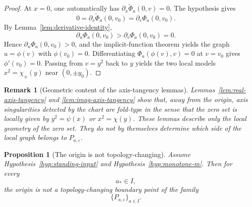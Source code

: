 \documentclass[11pt]{article}
\newtheorem{proposition}[theorem]{Proposition}
\newtheorem{remark}[theorem]{Remark}
\begin{document}
\begin{proof}
At \(x=0\), one automatically has \(\partial_x\widetilde\Phi_a(0,v)=0\). The hypothesis gives
\[
0=\partial_v\widetilde\Phi_a(0,v_0)=\partial_v\Phi_a(0,v_0).
\]
By Lemma~\ref{lem:derivative-identity},
\[
\partial_u\Phi_a(0,v_0)>\partial_v\Phi_a(0,v_0)=0.
\]
Hence \(\partial_u\Phi_a(0,v_0)>0\), and the implicit-function theorem yields the graph \(u=\phi(v)\) with \(\phi(v_0)=0\). Differentiating \(\Phi_a(\phi(v),v)=0\) at \(v=v_0\) gives \(\phi'(v_0)=0\). Passing from \(v=y^2\) back to \(y\) yields the two local models \(x^2=\chi_\pm(y)\) near \((0,\pm y_0)\).
\end{proof}

\begin{remark}[Geometric content of the axis-tangency lemmas]\label{rem:fold-geometry}
Lemmas~\ref{lem:real-axis-tangency} and \ref{lem:imag-axis-tangency} show that, away from the origin, axis singularities detected by the chart are fold-type in the sense that the zero set is locally given by \(y^2=\psi(x)\) or \(x^2=\chi(y)\). These lemmas describe only the local geometry of the zero set. They do not by themselves determine which side of the local graph belongs to \(P_{a,\varepsilon}\).
\end{remark}

\begin{proposition}[The origin is not topology-changing]\label{prop:origin-not-topology-changing}
Assume Hypothesis~\ref{hyp:standing-input} and Hypothesis~\ref{hyp:monotone-m}. Then for every
\[
a_*\in I,
\]
the origin is not a topology-changing boundary point of the family
\[
\{P_{a,\varepsilon}\}_{a\in I}.
\]
\end{proposition}
\end{document}
